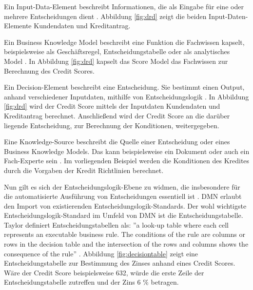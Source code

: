\begin{itemize*}

\item Ein Input-Data-Element beschreibt Informationen, die als Eingabe für eine oder mehrere Entscheidungen dient \cite[vgl. S. 30]{OM16}. Abbildung \ref{fig:drd} zeigt die beiden Input-Daten-Elemente Kundendaten und Kreditantrag. 

\item Ein Business Knowledge Model beschreibt eine Funktion die Fachwissen kapselt, beispielsweise als Geschäftsregel, Entscheidungstabelle oder als analytisches Model \cite[vgl. S. 30]{OM16}. In Abbildung \ref{fig:drd} kapselt das Score Model das Fachwissen zur Berechnung des Credit Scores.

\item Ein Decision-Element beschreibt eine Entscheidung. Sie bestimmt einen Output, anhand verschiedener Inputdaten, mithilfe von Entscheidungslogik \cite[vgl. S. 20]{OM16}. In Abbildung \ref{fig:drd} wird der Credit Score mittels der Inputdaten Kundendaten und Kreditantrag berechnet. Anschließend wird der Credit Score an die darüber liegende Entscheidung, zur Berechnung der Konditionen, weitergegeben.  

\item Eine Knowledge-Source beschreibt die Quelle einer Entscheidung oder eines Business Knowledge Models. Das kann beispielsweise ein Dokument oder auch ein Fach-Experte sein \cite[vgl. S. 18]{OM16}. Im vorliegenden Beispiel werden die Konditionen des Kredites durch die Vorgaben der Kredit Richtlinien berechnet.

\end{itemize*}

Nun gilt es sich der Entscheidungslogik-Ebene zu widmen, die insbesondere für die automatisierte Ausführung von Entscheidungen essentiell ist \cite[vgl. S. 18]{OM16}. DMN erlaubt den Import von existierenden Entscheidungslogik-Standards. Der wohl wichtigste Entscheidungslogik-Standard im Umfeld von DMN ist die Entscheidungstabelle. Taylor definiert Entscheidungstabellen als: ''a look-up table where each cell represents an executable business rule. The conditions of the rule are columns or rows in the decision table and the intersection of the rows and columns shows the consequence of the rule'' \cite[S. 132]{JT11}. Abbildung \ref{fig:decisiontable} zeigt eine Entscheidungstabelle zur Bestimmung des Zinses anhand eines Credit Scores. Wäre der Credit Score beispielsweise 632, würde die erste Zeile der Entscheidungstabelle zutreffen und der Zins 6 \%  betragen.

